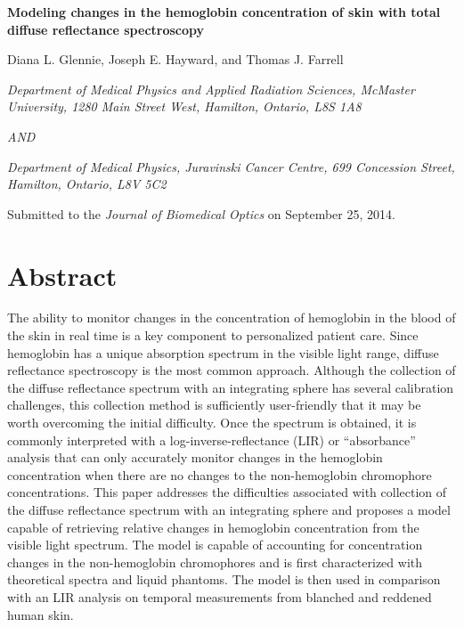 \begin{center}
	
	\textbf{Modeling changes in the hemoglobin concentration of skin with total diffuse reflectance spectroscopy}
	
	Diana L. Glennie, Joseph E. Hayward, and Thomas J. Farrell
	
	\textit{Department of Medical Physics and Applied Radiation Sciences, McMaster University, 1280 Main Street West, Hamilton, Ontario, L8S 1A8}

	\textit{AND}

	\textit{Department of Medical Physics, Juravinski Cancer Centre, 699 Concession Street, Hamilton, Ontario, L8V 5C2}

\end{center}

\noindent Submitted to the \textit{Journal of Biomedical Optics} on September 25, 2014.

\section*{Abstract}
The ability to monitor changes in the concentration of hemoglobin in the blood of the skin in real time is a key component to personalized patient care. Since hemoglobin has a unique absorption spectrum in the visible light range, diffuse reflectance spectroscopy is the most common approach. Although the collection of the diffuse reflectance spectrum with an integrating sphere has several calibration challenges, this collection method is sufficiently user-friendly that it may be worth overcoming the initial difficulty. Once the spectrum is obtained, it is commonly interpreted with a log-inverse-reflectance (LIR) or ``absorbance'' analysis that can only accurately monitor changes in the hemoglobin concentration when there are no changes to the non-hemoglobin chromophore concentrations. This paper addresses the difficulties associated with collection of the diffuse reflectance spectrum with an integrating sphere and proposes a model capable of retrieving relative changes in hemoglobin concentration from the visible light spectrum. The model is capable of accounting for concentration changes in the non-hemoglobin chromophores and is first characterized with theoretical spectra and liquid phantoms. The model is then used in comparison with an LIR analysis on temporal measurements from blanched and reddened human skin.

